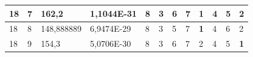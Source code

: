 \documentclass[conference]{IEEEtran}
\begin{document}
\begin{table}[]
\begin{tabular}{|llll|llllllll|}
\multicolumn{1}{|l|}{18}                                                    & \multicolumn{1}{l|}{7}                                                        & \multicolumn{1}{l|}{162,2}                                                        & 1,1044E-31                     & \multicolumn{1}{l|}{8}                                                  & \multicolumn{1}{l|}{3}                                                  & \multicolumn{1}{l|}{6}                                                  & \multicolumn{1}{l|}{7}                                                  & \multicolumn{1}{l|}{\textbf{1}}                                         & \multicolumn{1}{l|}{4}                                                  & \multicolumn{1}{l|}{5}                                                  & 2                          \\ \hline
\multicolumn{1}{|l|}{18}                                                    & \multicolumn{1}{l|}{8}                                                        & \multicolumn{1}{l|}{148,888889}                                                   & 6,9474E-29                     & \multicolumn{1}{l|}{8}                                                  & \multicolumn{1}{l|}{3}                                                  & \multicolumn{1}{l|}{5}                                                  & \multicolumn{1}{l|}{7}                                                  & \multicolumn{1}{l|}{\textbf{1}}                                         & \multicolumn{1}{l|}{4}                                                  & \multicolumn{1}{l|}{6}                                                  & 2                          \\ \hline
\multicolumn{1}{|l|}{18}                                                    & \multicolumn{1}{l|}{9}                                                        & \multicolumn{1}{l|}{154,3}                                                        & 5,0706E-30                     & \multicolumn{1}{l|}{8}                                                  & \multicolumn{1}{l|}{3}                                                  & \multicolumn{1}{l|}{6}                                                  & \multicolumn{1}{l|}{7}                                                  & \multicolumn{1}{l|}{2}                                                  & \multicolumn{1}{l|}{4}                                                  & \multicolumn{1}{l|}{5}                                                  & \textbf{1}                 \\ \hline

\end{tabular}
\end{table}
\end{document}
